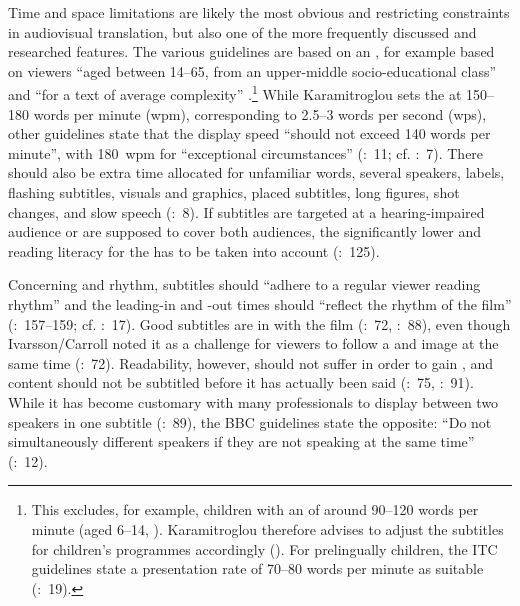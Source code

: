 Time and space limitations are likely the most obvious and restricting constraints in audiovisual translation, but also one of the more frequently discussed and researched features. The various guidelines are based on an , for example based on viewers “aged between 14--65, from an upper-middle socio-educational class” and “for a text of average complexity” \citep{Karamitroglou1998}.\footnote{This excludes, for example, children with an  of around 90--120 words per minute (aged 6--14, \citealt{Karamitroglou1998}). Karamitroglou therefore advises to adjust the subtitles for children’s programmes accordingly (\citealt{Karamitroglou1998}). For prelingually  children, the ITC guidelines state a presentation rate of 70--80 words per minute as suitable (\citeyear{Itc1999}:~19).} While Karamitroglou sets the  at 150--180 words per minute (wpm), corresponding to 2.5--3 words per second (wps), other guidelines state that the display speed “should not exceed 140 words per minute”, with 180~wpm for “exceptional circumstances” (\citealt{Itc1999}:~11; cf. \citealt{Ford_williams2009}:~7). There should also be extra time allocated for unfamiliar words, several speakers, labels, flashing subtitles, visuals and graphics, placed subtitles, long figures, shot changes, and slow speech (\citealt{Ford_williams2009}:~8). If subtitles are targeted at a hearing-impaired audience or are supposed to cover both audiences, the significantly lower  and reading literacy for the  has to be taken into account (\citealt{Jungst2010}:~125).

Concerning  and rhythm, subtitles should “adhere to a regular viewer reading rhythm” and the leading-in and -out times should “reflect the rhythm of the film” (\citealt{Ivarsson1998}:~157--159; cf. \citealt{Ford_williams2009}:~17). Good subtitles are in  with the film (\citealt{Ivarsson1998}:~72, \citealt{Diaz_cintas2007b}:~88), even though Ivarsson/Carroll noted it as a challenge for viewers to follow a  and image at the same time (\citeyear{Ivarsson1998}:~72). Readability, however, should not suffer in order to gain , and content should not be subtitled before it has actually been said (\citealt{Ivarsson1998}:~75, \citealt{Diaz_cintas2007b}:~91). While it has become customary with many professionals to display  between two speakers in one subtitle (\citealt{Diaz_cintas2007b}:~89), the BBC guidelines state the opposite: “Do not simultaneously  different speakers if they are not speaking at the same time” (\citealt{Ford_williams2009}:~12).


